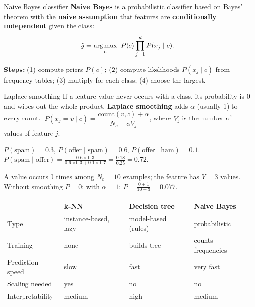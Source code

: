 \begin{dfn}{Naive Bayes classifier}
\textbf{Naive Bayes} is a probabilistic classifier based on Bayes' theorem with the \textbf{naive assumption} that features are \textbf{conditionally independent} given the class:
\[ \hat y=\operatorname*{arg\,max}_c\ P(c)\prod_{j=1}^dP(x_j\mid c). \]
\end{dfn}

\textbf{Steps:} (1) compute priors $P(c)$; (2) compute likelihoods $P(x_j\mid c)$ from frequency tables; (3) multiply for each class; (4) choose the largest.

\begin{dfn}{Laplace smoothing}
If a feature value never occurs with a class, its probability is $0$ and wipes out the whole product. \textbf{Laplace smoothing} adds $\alpha$ (usually 1) to every count:
$\ P(x_j=v\mid c)=\dfrac{\mathrm{count}(v,c)+\alpha}{N_c+\alpha V_j}$, where $V_j$ is the number of values of feature $j$.
\end{dfn}

\begin{numer}
$P(\text{spam})=0.3$, $P(\text{offer}\mid\text{spam})=0.6$, $P(\text{offer}\mid\text{ham})=0.1$.\\
$P(\text{spam}\mid\text{offer})=\frac{0.6\times0.3}{0.6\times0.3+0.1\times0.7}=\frac{0.18}{0.25}=\mathbf{0.72}$.
\end{numer}
\begin{numer}[: smoothing]
A value occurs $0$ times among $N_c=10$ examples; the feature has $V=3$ values. Without smoothing $P=0$; with $\alpha=1$: $P=\frac{0+1}{10+3}=\mathbf{0.077}$.
\end{numer}


\begin{center}
\small
\begin{tabular}{@{}p{2.6cm}p{4.3cm}p{4.3cm}p{4.3cm}@{}}
\toprule
 & \textbf{k-NN} & \textbf{Decision tree} & \textbf{Naive Bayes}\\
\midrule
Type & instance-based, lazy & model-based (rules) & probabilistic\\
Training & none & builds tree & counts frequencies\\
Prediction speed & slow & fast & very fast\\
Scaling needed & yes & no & no\\
Interpretability & medium & high & medium\\
\bottomrule
\end{tabular}
\end{center}


